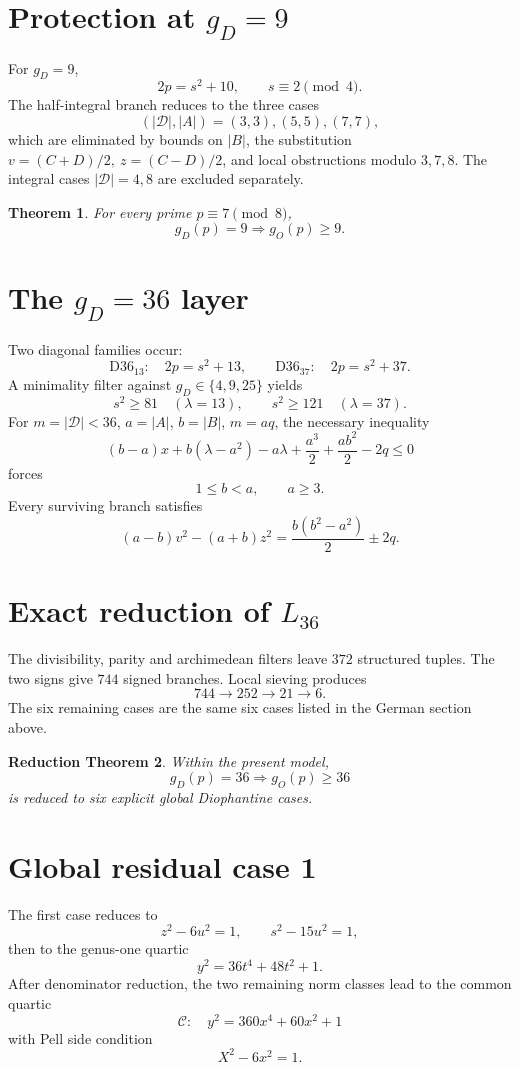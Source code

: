 \documentclass[11pt,a4paper]{article}
\newtheorem{theorem}{Theorem}[section]
\newtheorem{reduction}[theorem]{Reduction Theorem}
\theoremstyle{definition}
\newcommand{\Def}{\mathscr D}
\begin{document}
\section{Protection at \(g_D=9\)}
For \(g_D=9\),
\[
2p=s^2+10,\qquad s\equiv2\pmod4.
\]
The half-integral branch reduces to the three cases
\[
(|\Def|,|A|)=(3,3),(5,5),(7,7),
\]
which are eliminated by bounds on \(|B|\), the substitution \(v=(C+D)/2,\ z=(C-D)/2\), and local obstructions modulo \(3,7,8\). The integral cases \(|\Def|=4,8\) are excluded separately.

\begin{theorem}
For every prime \(p\equiv7\pmod8\),
\[
\boxed{g_D(p)=9\Longrightarrow g_O(p)\ge9.}
\]
\end{theorem}

\section{The \(g_D=36\) layer}
Two diagonal families occur:
\[
\mathrm{D36}_{13}:\quad 2p=s^2+13,
\qquad
\mathrm{D36}_{37}:\quad 2p=s^2+37.
\]
A minimality filter against \(g_D\in\{4,9,25\}\) yields
\[
s^2\ge81\quad(\lambda=13),
\qquad
s^2\ge121\quad(\lambda=37).
\]
For \(m=|\Def|<36\), \(a=|A|\), \(b=|B|\), \(m=aq\), the necessary inequality
\[
(b-a)x+b(\lambda-a^2)-a\lambda+\frac{a^3}{2}
+\frac{ab^2}{2}-2q\le0
\]
forces
\[
1\le b<a,\qquad a\ge3.
\]
Every surviving branch satisfies
\[
\boxed{
(a-b)v^2-(a+b)z^2
=
\frac{b(b^2-a^2)}2\pm2q.
}
\]

\section{Exact reduction of \(L_{36}\)}
The divisibility, parity and archimedean filters leave \(372\) structured tuples. The two signs give \(744\) signed branches. Local sieving produces
\[
744\longrightarrow252\longrightarrow21\longrightarrow6.
\]
The six remaining cases are the same six cases listed in the German section above.

\begin{reduction}
Within the present model,
\[
g_D(p)=36\Longrightarrow g_O(p)\ge36
\]
is reduced to six explicit global Diophantine cases.
\end{reduction}

\section{Global residual case 1}
The first case reduces to
\[
z^2-6u^2=1,\qquad s^2-15u^2=1,
\]
then to the genus-one quartic
\[
y^2=36t^4+48t^2+1.
\]
After denominator reduction, the two remaining norm classes lead to the common quartic
\[
\boxed{\mathcal C:\quad y^2=360x^4+60x^2+1}
\]
with Pell side condition
\[
\boxed{X^2-6x^2=1.}
\]
\end{document}
